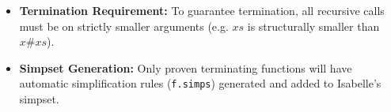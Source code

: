 \documentclass[10pt,a4paper]{article}
\begin{document}
\vspace{0.3em}

\begin{tcolorbox}[title={3. Important Rules for Termination \& Simpset}]
\begin{itemize}[leftmargin=1.2em, itemsep=3pt]
    \item \textbf{Termination Requirement:} To guarantee termination, all recursive calls must be on strictly smaller arguments (e.g. $xs$ is structurally smaller than $x \# xs$).
    \item \textbf{Simpset Generation:} Only proven terminating functions will have automatic simplification rules (\texttt{f.simps}) generated and added to Isabelle's simpset.
\end{itemize}
\end{tcolorbox}
\end{document}
